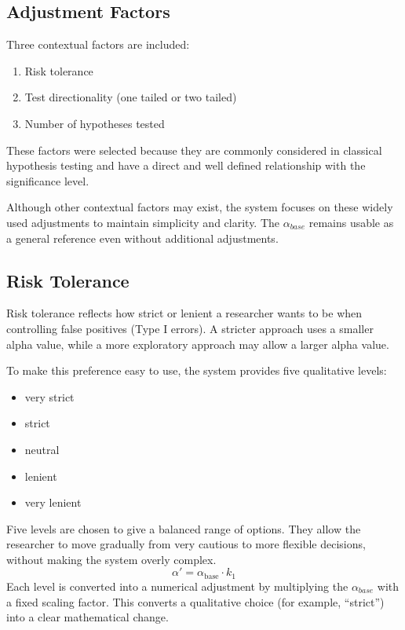 {\subsection{Adjustment Factors}

Three contextual factors are included:

\begin{enumerate}
	\item Risk tolerance
	\item Test directionality (one tailed or two tailed)
	\item Number of hypotheses tested
\end{enumerate}

These factors were selected because they are commonly considered in classical hypothesis testing and have a direct and well defined relationship with the significance level\cite{Baker2016}\cite{Hales2023}\cite{Herzog2019}.

Although other contextual factors may exist, the system focuses on these widely used adjustments to maintain simplicity and clarity. The $\alpha_{base}$ remains usable as a general reference even without additional adjustments.

\subsection{Risk Tolerance}

Risk tolerance reflects how strict or lenient a researcher wants to be when controlling false positives (Type I errors). A stricter approach uses a smaller alpha value, while a more exploratory approach may allow a larger alpha value\cite{Baker2016}.

To make this preference easy to use, the system provides five qualitative levels:


\begin{itemize}
	\item very strict
	\item strict
	\item neutral
	\item lenient
	\item very lenient
\end{itemize}

Five levels are chosen to give a balanced range of options. They allow the researcher to move gradually from very cautious to more flexible decisions, without making the system overly complex.
\begin{equation}
	\alpha' 
	= 
	\alpha_{\text{base}} \cdot k_1
\end{equation}
Each level is converted into a numerical adjustment by multiplying the $\alpha_{base}$ with a fixed scaling factor. This converts a qualitative choice (for example, “strict”) into a clear mathematical change.

}
